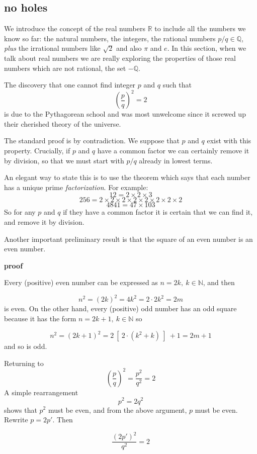 \documentclass[11pt, oneside]{article}
\begin{document}
\subsection*{no holes}

We introduce the concept of the real numbers $\mathbb{R}$ to include all the numbers we know so far: the natural numbers, the integers, the rational numbers $p/q \in \mathbb{Q}$, \emph{plus} the irrational numbers like $\sqrt{2}$ and also $\pi$ and $e$.  In this section, when we talk about real numbers we are really exploring the properties of those real numbers which are not rational, the set $- \mathbb{Q}$. 

The discovery that one cannot find integer $p$ and $q$ such that
\[ (\frac{p}{q})^2 = 2 \]
is due to the Pythagorean school and was most unwelcome since it screwed up their cherished theory of the universe.

The standard proof is by contradiction.  We suppose that $p$ and $q$ exist with this property.  Crucially, if $p$ and $q$ have a common factor we can certainly remove it by division, so that we must start with $p/q$ already in lowest terms.

An elegant way to state this is to use the theorem which says that each number has a unique prime \emph{factorization}.  For example:
\[ 12 = 2 \times 2 \times 3 \]
\[ 256 = 2 \times 2 \times 2 \times 2 \times 2 \times 2 \times 2 \times 2 \]
\[ 4841 = 47 \times 103 \]
So for any $p$ and $q$ if they have a common factor it is certain that we can find it, and remove it by division.

Another important preliminary result is that the square of an even number is an even number.

\textbf{proof}

Every (positive) even number can be expressed as $n = 2k, \ k \in \mathbb{N}$, and then

\[ n^2 = (2k)^2 = 4k^2 = 2 \cdot 2 k^2 = 2m \]
is even.  On the other hand, every (positive) odd number has an odd square because it has the form $n = 2k + 1, \ k \in \mathbb{N}$ so

\[ n^2 = (2k + 1)^2 = 2 \ [ \ 2 \cdot (k^2 + k) \ ] \  + 1 = 2m + 1 \]
and so is odd.

Returning to
\[ (\frac{p}{q})^2 = \frac{p^2}{q^2} = 2 \]
A simple rearrangement 
\[ p^2 = 2 q^2 \]
shows that $p^2$ must be even, and from the above argument, $p$ must be even.  Rewrite $p = 2p'$.  Then

\[ \frac{(2p')^2}{q^2} = 2 \]
\end{document}
